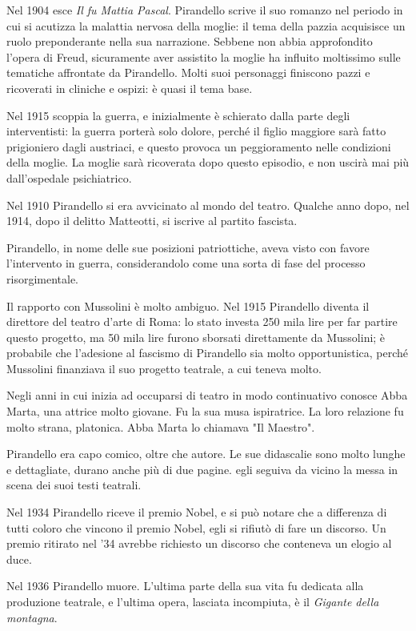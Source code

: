 \documentclass[a4paper, twoside, titlepage]{book}
\begin{document}
Nel 1904 esce \textit{Il fu Mattia Pascal}. Pirandello scrive il suo romanzo nel periodo in cui si acutizza la malattia nervosa della moglie: il tema della pazzia acquisisce un ruolo preponderante nella sua narrazione.
Sebbene non abbia approfondito l'opera di Freud, sicuramente aver assistito la moglie ha influito moltissimo sulle tematiche affrontate da Pirandello. Molti suoi personaggi finiscono pazzi e ricoverati in cliniche e ospizi: è quasi il tema base.

Nel 1915 scoppia la guerra, e inizialmente è schierato dalla parte degli interventisti: la guerra porterà solo dolore, perché il figlio maggiore sarà fatto prigioniero dagli austriaci, e questo provoca un peggioramento nelle condizioni della moglie.
La moglie sarà ricoverata dopo questo episodio, e non uscirà mai più dall'ospedale psichiatrico.

Nel 1910 Pirandello si era avvicinato al mondo del teatro.
Qualche anno dopo, nel 1914, dopo il delitto Matteotti, si iscrive al partito fascista.

Pirandello, in nome delle sue posizioni patriottiche, aveva visto con favore l'intervento in guerra, considerandolo come una sorta di fase del processo risorgimentale.

Il rapporto con Mussolini è molto ambiguo. Nel 1915 Pirandello diventa il direttore del teatro d'arte di Roma: lo stato investa 250 mila lire per far partire questo progetto, ma 50 mila lire furono sborsati direttamente da Mussolini; è probabile che l'adesione al fascismo di Pirandello sia molto opportunistica, perché Mussolini finanziava il suo progetto teatrale, a cui teneva molto.

Negli anni in cui inizia ad occuparsi di teatro in modo continuativo conosce Abba Marta, una attrice molto giovane. Fu la sua musa ispiratrice.
La loro relazione fu molto strana, platonica. Abba Marta lo chiamava "Il Maestro".

Pirandello era capo comico, oltre che autore. Le sue didascalie sono molto lunghe e dettagliate, durano anche più di due pagine. egli seguiva da vicino la messa in scena dei suoi testi teatrali.

Nel 1934 Pirandello riceve il premio Nobel, e si può notare che a differenza di tutti coloro che vincono il premio Nobel, egli si rifiutò di fare un discorso.
Un premio ritirato nel '34 avrebbe richiesto un discorso che conteneva un elogio al duce.

Nel 1936 Pirandello muore. L'ultima parte della sua vita fu dedicata alla produzione teatrale, e l'ultima opera, lasciata incompiuta, è il \textit{Gigante della montagna}.
\end{document}
